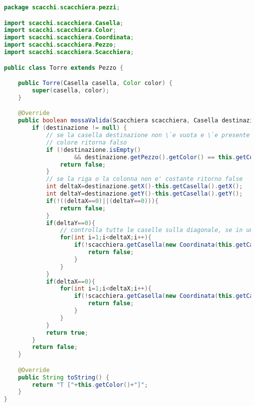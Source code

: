 \documentclass{article}
\begin{document}
\begin{lstlisting}[language=Java,escapechar=|]
package scacchi.scacchiera.pezzi;

import scacchi.scacchiera.Casella;
import scacchi.scacchiera.Color;
import scacchi.scacchiera.Coordinata;
import scacchi.scacchiera.Pezzo;
import scacchi.scacchiera.Scacchiera;

public class Torre extends Pezzo {

	public Torre(Casella casella, Color color) {
		super(casella, color);
	}

	@Override
	public boolean mossaValida(Scacchiera scacchiera, Casella destinazione) {
		if (destinazione != null) {
			// se la casella destinazione non \`e vuota e \`e presente un Pezzo dello stesso
			// colore ritorna falso
			if (!destinazione.isEmpty()
					&& destinazione.getPezzo().getColor() == this.getColor()) {
				return false;
			}
			// se la riga o la colonna non e' costante ritorno false
			int deltaX=destinazione.getX()-this.getCasella().getX();
			int deltaY=destinazione.getY()-this.getCasella().getY();
			if(!((deltaX==0)||(deltaY==0))){
				return false;
			}
			if(deltaY==0){
				// controlla tutte le caselle sulla diagonale, se in una di queste c'e' un pezzo ritorna false
				for(int i=1;i<deltaX;i++){
					if(!scacchiera.getCasella(new Coordinata(this.getCasella().getX() +i, this.getCasella().getY())).isEmpty()){
						return false;
					}
				}
			}
			if(deltaX==0){
				for(int i=1;i<deltaX;i++){
					if(!scacchiera.getCasella(new Coordinata(this.getCasella().getX(), this.getCasella().getY()+i)).isEmpty()){
						return false;
					}
				}
			}
			return true;
		}
		return false;
	}

	@Override
	public String toString() {
		return "T ["+this.getColor()+"]";
	}
}
\end{lstlisting}
\end{document}
